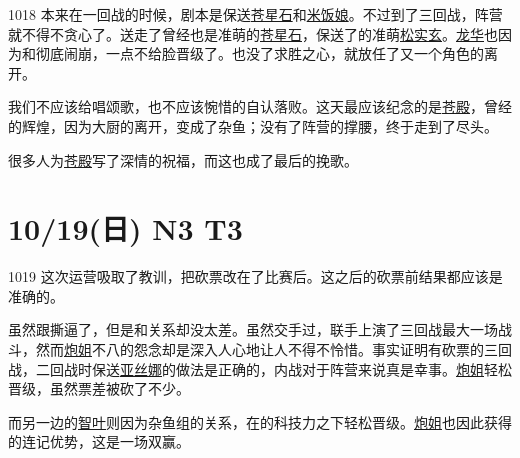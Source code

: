 1018 本来在一回战的时候，剧本是保送\uline{苍星石}和\uline{米饭娘}。不过到了三回战，阵营就不得不贪心了。送走了曾经也是准萌的\uline{苍星石}，保送了的准萌\uline{松实玄}。\uline{龙华}也因为和彻底闹崩，一点不给脸晋级了。也没了求胜之心，就放任了又一个角色的离开。

我们不应该给唱颂歌，也不应该惋惜的自认落败。这天最应该纪念的是\uline{苍殿}，曾经的辉煌，因为大厨的离开，变成了杂鱼；没有了阵营的撑腰，终于走到了尽头。

很多人为\uline{苍殿}写了深情的祝福，而这也成了最后的挽歌。
\newpage
\section{10/19(日) N3 T3}


1019 这次运营吸取了教训，把砍票改在了比赛后。这之后的{\kai 砍票前}结果都应该是准确的。

虽然跟撕逼了，但是和关系却没太差。虽然交手过，联手上演了三回战最大一场战斗，然而\uline{炮姐}不八的怨念却是深入人心地让人不得不怜惜。事实证明有砍票的三回战，二回战时保送\uline{亚丝娜}的做法是正确的，内战对于阵营来说真是幸事。\uline{炮姐}轻松晋级，虽然票差被砍了不少。

而另一边的\uline{智叶}则因为杂鱼组的关系，在的科技力之下轻松晋级。\uline{炮姐}也因此获得的连记优势，这是一场双赢。

